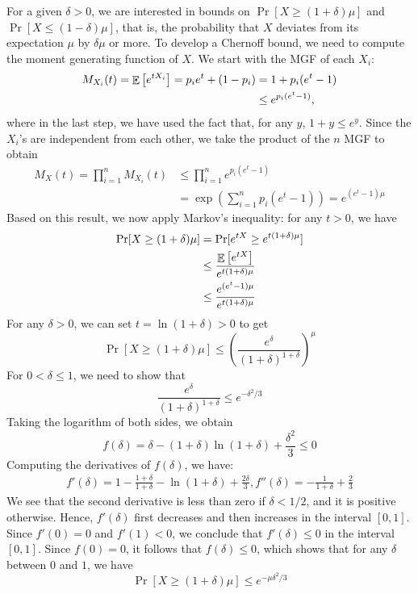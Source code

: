For a given $\delta > 0$, we are interested in bounds on $\Pr[X \ge (1 + \delta) \mu]$ and $\Pr[X \le (1 - \delta) \mu]$, that is, the probability that $X$ deviates from its expectation $\mu$ by $\delta \mu$ or more.
To develop a Chernoff bound, we need to compute the moment generating function of $X$.
We start with the MGF of each $X_i$:
\begin{align*}
    M_{X_i} (t) = \mathop{\mathbb{E}}\left[ e^{t X_i} \right] = p_i e^t + (1 - p_i) &= 1 + p_i (e^t - 1) \\
    &\le e^{p_i(e^t - 1)},
\end{align*}
where in the last step, we have used the fact that, for any $y$, $1 + y \le e^y$.
Since the $X_i$'s are independent from each other, we take the product of the $n$ MGF to obtain
\begin{align*}
    M_X(t) = \prod_{i=1}^n M_{X_i}(t) &\le \prod_{i=1}^n e^{p_i(e^t - 1)} \\
    &= \exp\left(\sum_{i=1}^n p_i (e^t - 1) \right) = e^{(e^t - 1) \mu}
\end{align*}
Based on this result, we now apply Markov's inequality: for any $t > 0$, we have
\begin{align*}
    \Pr[X \ge (1 + \delta) \mu] &= \Pr[e^{tX} \ge e^{t(1 + \delta) \mu}] \\
    &\le \frac {\mathop{\mathbb{E}}\left[ e^{tX} \right]} {e^{t(1 + \delta) \mu}} \\
    &\le \frac {e^{(e^t - 1) \mu}} {e^{t(1 + \delta) \mu}}
\end{align*}
For any $\delta >0$, we can set $t = \ln(1 + \delta) > 0$ to get
\[ \Pr[X \ge (1 + \delta) \mu] \le \left( \frac {e^{\delta}} {(1 + \delta)^{1 + \delta}} \right)^{\mu} \]
For $0 < \delta \le 1$, we need to show that
\[ \frac {e^{\delta}} {(1 + \delta)^{1 + \delta}} \le e^{-\delta^2 / 3} \]
Taking the logarithm of both sides, we obtain
\[ f(\delta) = \delta - (1 + \delta) \ln(1 + \delta) + \frac {\delta^2} 3 \le 0 \]
Computing the derivatives of $f(\delta)$, we have:
\begin{align*}
    f'(\delta) = 1 - \frac {1 + \delta}{1 + \delta} - \ln(1 + \delta) + \frac {2 \delta} 3,
    f''(\delta) = - \frac 1 {1 + \delta} + \frac 2 3
\end{align*}
We see that the second derivative is less than zero if $\delta < 1/2$, and it is positive otherwise.
Hence, $f'(\delta)$ first decreases and then increases in the interval $[0, 1]$.
Since $f'(0) = 0$ and $f'(1) < 0$, we conclude that $f'(\delta) \le 0$ in the interval $[0, 1]$.
Since $f(0) = 0$, it follows that $f(\delta) \le 0$, which shows that for any $\delta$ between $0$ and $1$, we have
\[ \Pr[X \ge (1 + \delta)\mu] \le e^{-\mu\delta^2 / 3}\]


